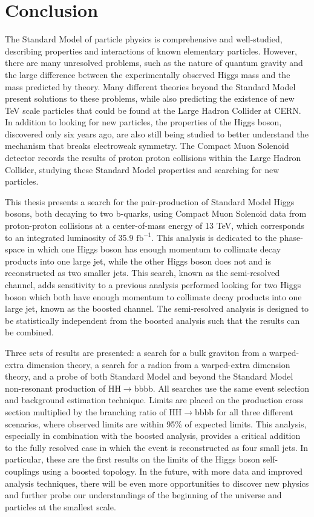 \chapter{Conclusion}

The Standard Model of particle physics is comprehensive and well-studied, describing properties and interactions of known elementary particles. However, there are many unresolved problems, such as the nature of quantum gravity and the large difference between the experimentally observed Higgs mass and the mass predicted by theory. Many different theories beyond the Standard Model present solutions to these problems, while also predicting the existence of new TeV scale particles that could be found at the Large Hadron Collider at CERN. In addition to looking for new particles, the properties of the Higgs boson, discovered only six years ago, are also still being studied to better understand the mechanism that breaks electroweak symmetry. The Compact Muon Solenoid detector records the results of proton proton collisions within the Large Hadron Collider, studying these Standard Model properties and searching for new particles.

This thesis presents a search for the pair-production of Standard Model Higgs bosons, both decaying to two b-quarks, using Compact Muon Solenoid data from proton-proton collisions at a center-of-mass energy of 13 TeV, which corresponds to an integrated luminosity of 35.9 $\text{fb}^{-1}$. This analysis is dedicated to the phase-space in which one Higgs boson has enough momentum to collimate decay products into one large jet, while the other Higgs boson does not and is reconstructed as two smaller jets. This search, known as the semi-resolved channel, adds sensitivity to a previous analysis performed looking for two Higgs boson which both have enough momentum to collimate decay products into one large jet, known as the boosted channel. The semi-resolved analysis is designed to be statistically independent from the boosted analysis such that the results can be combined.

Three sets of results are presented: a search for a bulk graviton from a warped-extra dimension theory, a search for a radion from a warped-extra dimension theory, and a probe of both Standard Model and beyond the Standard Model non-resonant production of HH$\rightarrow$bbbb. All searches use the same event selection and background estimation technique. Limits are placed on the production cross section multiplied by the branching ratio of HH$\rightarrow$bbbb for all three different scenarios, where observed limits are within 95\% of expected limits. This analysis, especially in combination with the boosted analysis, provides a critical addition to the fully resolved case in which the event is reconstructed as four small jets. In particular, these are the first results on the limits of the Higgs boson self-couplings using a boosted topology. In the future, with more data and improved analysis techniques, there will be even more opportunities to discover new physics and further probe our understandings of the beginning of the universe and particles at the smallest scale.
